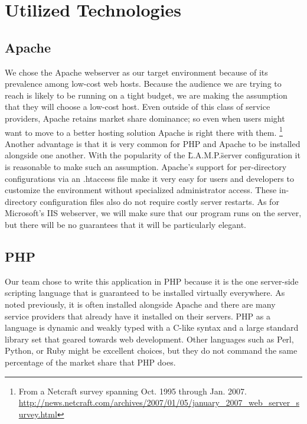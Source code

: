 \documentclass[a4paper,12pt]{report}
\begin{document}
\chapter{Utilized Technologies}

\section{Apache}
We chose the Apache webserver as our target environment because of its prevalence among low-cost web hosts.
Because the audience we are trying to reach is likely to be running on a tight budget, we are making the assumption that they will choose a low-cost host.
Even outside of this class of service providers, Apache retains market share dominance; so even when users might want to move to a better hosting solution Apache is right there with them. \footnote{From a Netcraft survey spanning Oct. 1995 through Jan. 2007. \url{http://news.netcraft.com/archives/2007/01/05/january_2007_web_server_survey.html}}
Another advantage is that it is very common for PHP and Apache to be installed alongside one another.
With the popularity of the \"L.A.M.P.\" server configuration it is reasonable to make such an assumption.
Apache's support for per-directory configurations via an .htaccess file make it very easy for users and developers to customize the environment without specialized administrator access.
These in-directory configuration files also do not require costly server restarts.
As for Microsoft's IIS webserver, we will make sure that our program runs on the server, but there will be no guarantees that it will be particularly elegant.

\section{PHP}
Our team chose to write this application in PHP because it is the one server-side scripting language that is guaranteed to be installed virtually everywhere.
As noted previously, it is often installed alongside Apache and there are many service providers that already have it installed on their servers.
PHP as a language is dynamic and weakly typed with a C-like syntax and a large standard library set that geared towards web development.
Other languages such as Perl, Python, or Ruby might be excellent choices, but they do not command the same percentage of the market share that PHP does.
\end{document}
